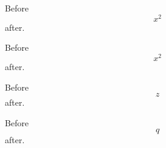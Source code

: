 Before
\[
  x^2
\]
after.

Before
\[
  x^2
\]
after.



Before
\[
  z
\]%
after.

Before
$$
  q
$$
after.
